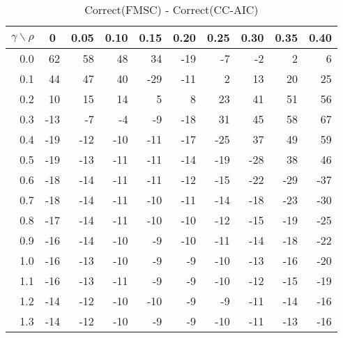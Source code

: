 \documentclass[12pt]{article}
\begin{document}
%
\begin{table}[!tbp]
\caption{Correct(FMSC) - Correct(CC-AIC)}
 \begin{center}
 \begin{tabular}{r|rrrrrrrrr}\hline\hline
\multicolumn{1}{c|}{$\gamma\backslash\rho$}&\multicolumn{1}{c}{0}&\multicolumn{1}{c}{0.05}&\multicolumn{1}{c}{0.10}&\multicolumn{1}{c}{0.15}&\multicolumn{1}{c}{0.20}&\multicolumn{1}{c}{0.25}&\multicolumn{1}{c}{0.30}&\multicolumn{1}{c}{0.35}&\multicolumn{1}{c}{0.40}\tabularnewline
\hline



0.0& 62& 58& 48& 34&-19& -7& -2&  2&  6\tabularnewline
0.1& 44& 47& 40&-29&-11&  2& 13& 20& 25\tabularnewline
0.2& 10& 15& 14&  5&  8& 23& 41& 51& 56\tabularnewline
0.3&-13& -7& -4& -9&-18& 31& 45& 58& 67\tabularnewline
0.4&-19&-12&-10&-11&-17&-25& 37& 49& 59\tabularnewline
0.5&-19&-13&-11&-11&-14&-19&-28& 38& 46\tabularnewline
0.6&-18&-14&-11&-11&-12&-15&-22&-29&-37\tabularnewline
0.7&-18&-14&-11&-10&-11&-14&-18&-23&-30\tabularnewline
0.8&-17&-14&-11&-10&-10&-12&-15&-19&-25\tabularnewline
0.9&-16&-14&-10& -9&-10&-11&-14&-18&-22\tabularnewline
1.0&-16&-13&-10& -9& -9&-10&-13&-16&-20\tabularnewline
1.1&-16&-13&-11& -9& -9&-10&-12&-15&-19\tabularnewline
1.2&-14&-12&-10&-10& -9& -9&-11&-14&-16\tabularnewline
1.3&-14&-12&-10& -9& -9&-10&-11&-13&-16\tabularnewline
\hline
\end{tabular}

\end{center}

\end{table}
\end{document}
